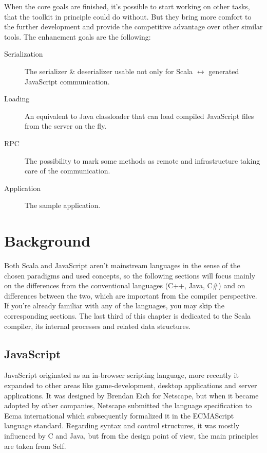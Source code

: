 \documentclass[12pt,a4paper]{report}
\begin{document}
When the core goals are finished, it's possible to start working on other tasks, that the toolkit in principle could do without. But they bring more comfort to the further development and provide the competitive advantage over other similar tools. The enhanement goals are the following:

\begin{description}
\item[Serialization] The serializer \& deserializer usable not only for Scala $\leftrightarrow$ generated JavaScript communication.
\item[Loading] An equivalent to Java classloader that can load compiled JavaScript files from the server on the fly.
\item[RPC] The possibility to mark some methods as remote and infrastructure taking care of the communication.
\item[Application] The sample application.
\end{description}



\chapter{Background}

Both Scala and JavaScript aren't mainstream languages in the sense of the chosen paradigms and used concepts, so the following sections will focus mainly on the differences from the conventional languages (C++, Java, C\#) and on differences between the two, which are important from the compiler perspective. If you're already familiar with any of the languages, you may skip the corresponding sections. The last third of this chapter is dedicated to the Scala compiler, its internal processes and related data structures.

\section{JavaScript}

JavaScript originated as an in-browser scripting language, more recently it expanded to other areas like game-development, desktop applications and server applications. It was designed by Brendan Eich for Netscape, but when it became adopted by other companies, Netscape submitted the language specification to Ecma international which subsequently formalized it in the ECMAScript language standard. Regarding syntax and control structures, it was mostly influenced by C and Java, but from the design point of view, the main principles are taken from Self.
\end{document}
